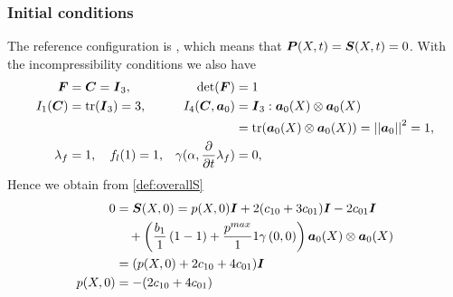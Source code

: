 \subsubsection{Initial conditions}
The reference configuration is , which means that $\boldsymbol{P}(X,t) = \boldsymbol{S}(X,t) = 0$.
With the incompressibility conditions we also have
\begin{align*}
	\boldsymbol{F} &= \boldsymbol{C} = \boldsymbol{I}_3, & \det(\boldsymbol{F}) &= 1\\
	I_1(\boldsymbol{C}) &= \operatorname{tr}(\boldsymbol{I}_3) = 3, & I_4(\boldsymbol{C},\boldsymbol{a}_0) & = \boldsymbol{I}_3 : \boldsymbol{a}_0(X)\otimes\boldsymbol{a}_0(X)\\
		&&&	= \operatorname{tr}(\boldsymbol{a}_0(X)\otimes\boldsymbol{a}_0(X)) = \left|\left|\boldsymbol{a}_0\right|\right|_{}^2 = 1,\\
		\lambda_f &= 1,\quad f_l(1) = 1, & \gamma(\alpha,\frac{\partial }{\partial t}\lambda_f) &= 0,
\end{align*}
Hence we obtain from \eqref{def:overallS}
\begin{align}
	0 &= \boldsymbol{S}(X,0) = p(X,0)\boldsymbol{I} + 2(c_{10} + 3c_{01})\boldsymbol{I} - 2c_{01}\boldsymbol{I}\\
			 &\quad+\left(\frac{b_1}{1}\left(1 - 1\right)+\frac{p^{max}}{1}1\gamma\left(0,0\right)\right)\boldsymbol{a}_0(X)\otimes\boldsymbol{a}_0(X)\nonumber\\
			 & = (p(X,0) + 2c_{10} + 4c_{01})\boldsymbol{I}\\
			 p(X,0) &= -(2c_{10} + 4c_{01})
\end{align}


